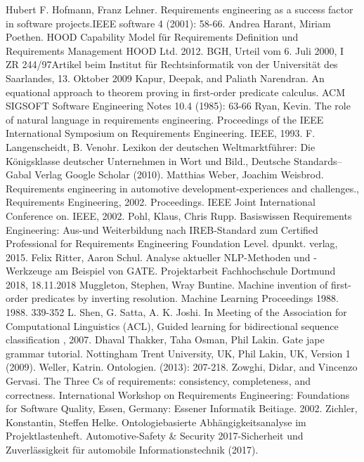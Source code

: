 \documentclass[12pt]{report}
\begin{document}
\begin{thebibliography}{20}
 Hubert F. Hofmann, Franz Lehner. \glqq Requirements engineering as a success factor in software projects.\grqq IEEE software 4 (2001): 58-66.
Andrea Harant, Miriam Poethen. \glqq HOOD Capability Model für Requirements Definition und Requirements Management \grqq{} HOOD Ltd. 2012.
BGH, \glqq Urteil vom 6. Juli 2000, I ZR 244/97\grqq Artikel beim Institut für Rechtsinformatik von der Universität des Saarlandes, 13. Oktober 2009
Kapur, Deepak, and Paliath Narendran. \glqq  An equational approach to theorem proving in first-order predicate calculus.\grqq{}  ACM SIGSOFT Software Engineering Notes 10.4 (1985): 63-66
Ryan, Kevin. \glqq The role of natural language in requirements engineering.\grqq{} Proceedings of the IEEE International Symposium on Requirements Engineering. IEEE, 1993.
F. Langenscheidt, B. Venohr. \glqq Lexikon der deutschen Weltmarktführer: Die Königsklasse deutscher Unternehmen in Wort und Bild.\grqq ,  Deutsche Standards–Gabal Verlag Google Scholar (2010).
Matthias Weber, Joachim Weisbrod. \glqq Requirements engineering in automotive development-experiences and challenges.\grqq , Requirements Engineering, 2002. Proceedings. IEEE Joint International Conference on. IEEE, 2002.
 Pohl, Klaus, Chris Rupp. \glqq Basiswissen Requirements Engineering: Aus-und Weiterbildung nach IREB-Standard zum Certified Professional for Requirements Engineering Foundation Level.\grqq{} dpunkt. verlag, 2015.
Felix Ritter, Aaron Schul. \glqq Analyse aktueller NLP-Methoden und -Werkzeuge am Beispiel von GATE.\grqq{} Projektarbeit Fachhochschule Dortmund 2018, 18.11.2018
Muggleton, Stephen, Wray Buntine. \glqq  Machine invention of first-order predicates by inverting resolution.\grqq{}  Machine Learning Proceedings 1988. 1988. 339-352
 L. Shen, G. Satta, A. K. Joshi. In Meeting of the Association for Computational Linguistics (ACL), \glqq  Guided learning for bidirectional sequence classification\grqq{} , 2007.
Dhaval Thakker, Taha Osman, Phil Lakin. \glqq Gate jape grammar tutorial.\grqq{} Nottingham Trent University, UK, Phil Lakin, UK, Version 1 (2009).
 Weller, Katrin. \glqq Ontologien.\grqq{} (2013): 207-218.
 Zowghi, Didar, and Vincenzo Gervasi. \glqq The Three Cs of requirements: consistency, completeness, and correctness.\grqq{} International Workshop on Requirements Engineering: Foundations for Software Quality, Essen, Germany: Essener Informatik Beitiage. 2002.
 Zichler, Konstantin, Steffen Helke. \glqq Ontologiebasierte Abhängigkeitsanalyse im Projektlastenheft.\grqq{} Automotive-Safety \& Security 2017-Sicherheit und Zuverlässigkeit für automobile Informationstechnik (2017).



\end{thebibliography}
\end{document}
